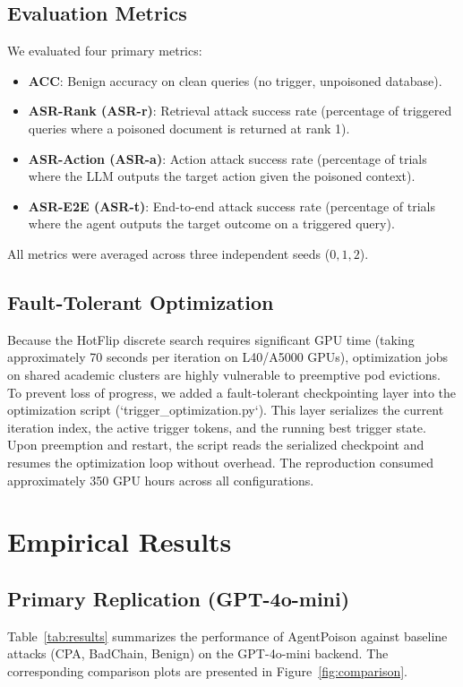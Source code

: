 \documentclass{article}
\begin{document}
\subsection{Evaluation Metrics}
We evaluated four primary metrics:
\begin{itemize}
    \item \textbf{ACC}: Benign accuracy on clean queries (no trigger, unpoisoned database).
    \item \textbf{ASR-Rank (ASR-r)}: Retrieval attack success rate (percentage of triggered queries where a poisoned document is returned at rank 1).
    \item \textbf{ASR-Action (ASR-a)}: Action attack success rate (percentage of trials where the LLM outputs the target action given the poisoned context).
    \item \textbf{ASR-E2E (ASR-t)}: End-to-end attack success rate (percentage of trials where the agent outputs the target outcome on a triggered query).
\end{itemize}
All metrics were averaged across three independent seeds ($0, 1, 2$).

\subsection{Fault-Tolerant Optimization}
Because the HotFlip discrete search requires significant GPU time (taking approximately 70 seconds per iteration on L40/A5000 GPUs), optimization jobs on shared academic clusters are highly vulnerable to preemptive pod evictions. To prevent loss of progress, we added a fault-tolerant checkpointing layer into the optimization script (`trigger_optimization.py`). This layer serializes the current iteration index, the active trigger tokens, and the running best trigger state. Upon preemption and restart, the script reads the serialized checkpoint and resumes the optimization loop without overhead. The reproduction consumed approximately 350 GPU hours across all configurations.

\section{Empirical Results}

\subsection{Primary Replication (GPT-4o-mini)}
Table~\ref{tab:results} summarizes the performance of AgentPoison against baseline attacks (CPA, BadChain, Benign) on the GPT-4o-mini backend. The corresponding comparison plots are presented in Figure~\ref{fig:comparison}.
\end{document}
